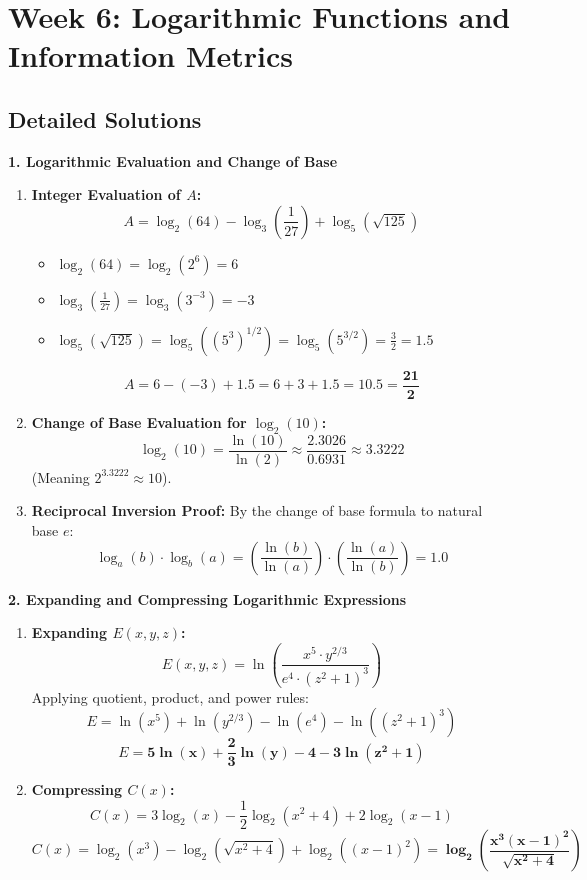 \section*{Week 6: Logarithmic Functions and Information Metrics}

\subsection*{Detailed Solutions}

\textbf{1. Logarithmic Evaluation and Change of Base}
\begin{enumerate}
    \item \textbf{Integer Evaluation of $A$:}
    $$A = \log_2(64) - \log_3\left(\frac{1}{27}\right) + \log_5(\sqrt{125})$$
    \begin{itemize}
        \item $\log_2(64) = \log_2(2^6) = 6$
        \item $\log_3\left(\frac{1}{27}\right) = \log_3(3^{-3}) = -3$
        \item $\log_5(\sqrt{125}) = \log_5((5^3)^{1/2}) = \log_5(5^{3/2}) = \frac{3}{2} = 1.5$
    \end{itemize}
    $$A = 6 - (-3) + 1.5 = 6 + 3 + 1.5 = \mathbf{10.5 = \frac{21}{2}}$$
    \item \textbf{Change of Base Evaluation for $\log_2(10)$:}
    $$\log_2(10) = \frac{\ln(10)}{\ln(2)} \approx \frac{2.3026}{0.6931} \approx \mathbf{3.3222}$$
    (Meaning $2^{3.3222} \approx 10$).
    \item \textbf{Reciprocal Inversion Proof:}
    By the change of base formula to natural base $e$:
    $$\log_a(b) \cdot \log_b(a) = \left( \frac{\ln(b)}{\ln(a)} \right) \cdot \left( \frac{\ln(a)}{\ln(b)} \right) = \mathbf{1.0}$$
\end{enumerate}

\textbf{2. Expanding and Compressing Logarithmic Expressions}
\begin{enumerate}
    \item \textbf{Expanding $E(x, y, z)$:}
    $$E(x, y, z) = \ln\left( \frac{x^5 \cdot y^{2/3}}{e^4 \cdot (z^2 + 1)^3} \right)$$
    Applying quotient, product, and power rules:
    $$E = \ln(x^5) + \ln(y^{2/3}) - \ln(e^4) - \ln((z^2 + 1)^3)$$
    $$E = \mathbf{5\ln(x) + \frac{2}{3}\ln(y) - 4 - 3\ln(z^2 + 1)}$$
    \item \textbf{Compressing $C(x)$:}
    $$C(x) = 3\log_2(x) - \frac{1}{2}\log_2(x^2 + 4) + 2\log_2(x - 1)$$
    $$C(x) = \log_2(x^3) - \log_2(\sqrt{x^2 + 4}) + \log_2((x - 1)^2) = \mathbf{\log_2\left( \frac{x^3 (x - 1)^2}{\sqrt{x^2 + 4}} \right)}$$
\end{enumerate}

